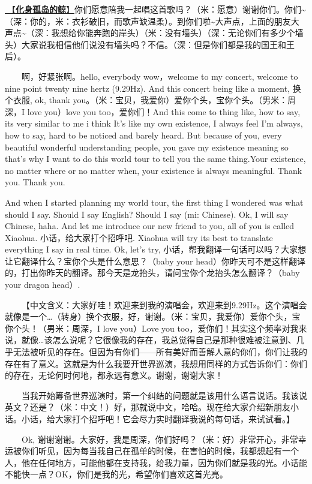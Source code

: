 \documentclass[]{ctexbook}
\begin{document}
\hyperref[hua-shen-gu-dao-de-jing]{🎵【\textbf{化身孤岛的鲸}】}你们愿意陪我一起唱这首歌吗？（米：愿意）谢谢你们。你们\textasciitilde（深：你的，米：衣衫破旧，而歌声缺温柔）。到你们啦\textasciitilde 大声点，上面的朋友大声点\textasciitilde（深：我想给你能奔跑的岸头）（米：没有墙头）（深：无论你们有多少个墙头）大家说我相信他们说没有墙头吗？不信。（深：但是你们都是我的国王和王后）。

  啊，好紧张啊。hello, everybody wow，welcome to my concert, welcome to nine point twenty nine hertz (9.29Hz). And this concert being like a moment, 换个衣服, ok, thank you。（米：宝贝，我爱你）爱你个头，宝你个头。（男米：周深，I love you）love you too，爱你们！And this come to thing like, how to say, its very similar to me i think It's like my own existence, I always feel I'm always, how to say, hard to be noticed and barely heard. But because of you, every beautiful wonderful understanding people, you gave my existence meaning so that's why I want to do this world tour to tell you the same thing.Your existence, no matter where or no matter when, your existence is always meaningful. Thank you. Thank you.

And when I started planning my world tour, the first thing I wondered was what should I say. Should I say English? Should I say (mi: Chinese). Ok, I will say Chinese, haha. And let me introduce our new friend to you, all of you is called Xiaohua. 小话，给大家打个招呼吧. Xiaohua will try its best to translate everything I say in real time. Ok, let's try, 小话，帮我翻译一句话可以吗？大家想让它翻译什么？宝你个头是什么意思？（baby your head）你昨天可不是这样翻译的，打出你昨天的翻译。那今天是龙抬头，请问宝你个龙抬头怎么翻译？（baby your dragon head）.

  【中文含义：大家好哇！欢迎来到我的演唱会，欢迎来到9.29Hz。这个演唱会就像是一个\ldots（转身）换个衣服，好，谢谢。（米：宝贝，我爱你）爱你个头，宝你个头！（男米：周深，I love you）Love you too，爱你们！其实这个频率对我来说，就像\ldots 该怎么说呢？它很像我的存在，我总觉得自己是那种很难被注意到、几乎无法被听见的存在。但因为有你们------所有美好而善解人意的你们，你们让我的存在有了意义。这就是为什么我要开世界巡演，我想用同样的方式告诉你们：你们的存在，无论何时何地，都永远有意义。谢谢，谢谢大家！

  当我开始筹备世界巡演时，第一个纠结的问题就是该用什么语言说话。我该说英文？还是？（米：中文！）好，那就说中文，哈哈。现在给大家介绍新朋友小话。小话，给大家打个招呼吧！它会尽力实时翻译我说的每句话，来试试看。】

  Ok, 谢谢谢谢。大家好，我是周深，你们好吗？（米：好）非常开心，非常幸运被你们听见，因为每当我自己在孤单的时候，在害怕的时候，我都想起有一个人，他在任何地方，可能他都在支持我，给我力量，因为你们就是我的光。小话能不能快一点？OK，你们是我的光，希望你们喜欢这首光亮。
\end{document}
